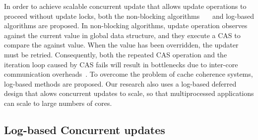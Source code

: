 In order to achieve scalable concurrent update that allows update operations
to proceed without update locks, both the non-blocking
algorithms~\cite{Harris2001Lockfree}~\cite{Fomitchev2004Lockfree}~\cite{Timnat2012}
and log-based algorithms are proposed.
In non-blocking algorithms, update operation observes against the current
value in global data structure, and they execute a CAS to compare the against
value.
When the value has been overridden, the updater must be retried.
Consequently, both the repeated CAS operation and the iteration loop caused
by CAS fails will result in bottlenecks due to inter-core communication
overheads~\cite{SilasBoydWickizerPth}.
To overcome the problem of cache coherence systems, log-based methods are
proposed.
Our research also uses a log-based deferred design that alows concurrent
updates to scale, so that multiprocessed applications can scale to large numbers of cores.
\fi

\subsection{Log-based Concurrent updates}


